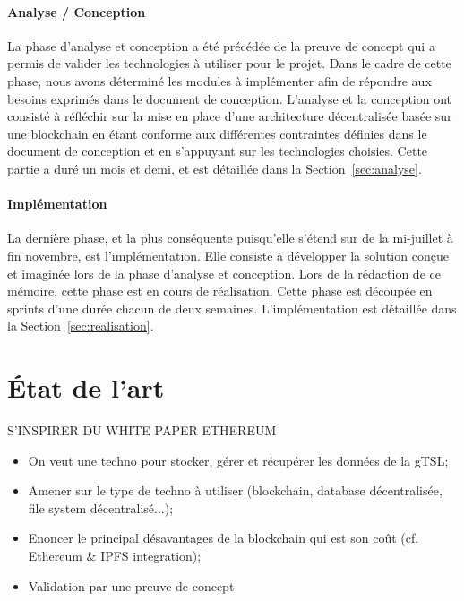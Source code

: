 \documentclass{tnreport}
\begin{document}
\subsubsection{Analyse / Conception}

La phase d'analyse et conception a été précédée de la preuve de concept qui a permis de valider les technologies à utiliser pour le projet. Dans le cadre de cette phase, nous avons déterminé les modules à implémenter afin de répondre aux besoins exprimés dans le document de conception. L'analyse et la conception ont consisté à réfléchir sur la mise en place d'une architecture décentralisée basée sur une blockchain en étant conforme aux différentes contraintes définies dans le document de conception et en s'appuyant sur les technologies choisies. Cette partie a duré un mois et demi, et est détaillée dans la Section~\ref{sec:analyse}.

\subsubsection{Implémentation}

La dernière phase, et la plus conséquente puisqu'elle s'étend sur de la mi-juillet à fin novembre, est l'implémentation. Elle consiste à développer la solution conçue et imaginée lors de la phase d'analyse et conception. Lors de la rédaction de ce mémoire, cette phase est en cours de réalisation. Cette phase est découpée en sprints d'une durée chacun de deux semaines. L'implémentation est détaillée dans la Section~\ref{sec:realisation}. 

\chapter{État de l'art}
\label{sec:state-of-the-art}

S'INSPIRER DU WHITE PAPER ETHEREUM

\begin{itemize}
	\item On veut une techno pour stocker, gérer et récupérer les données de la gTSL; 
	\item Amener sur le type de techno à utiliser (blockchain, database décentralisée, file system décentralisé...);
	\item Enoncer le principal désavantages de la blockchain qui est son coût (cf. Ethereum \& IPFS integration);
	\item Validation par une preuve de concept
\end{itemize}
\end{document}
